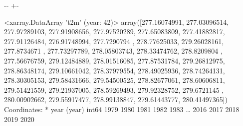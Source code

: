 \documentclass[letterpaper,10pt,english]{sphinxmanual}
\newlength\nbsphinxcodecellspacing
\begin{document}
{
\begin{sphinxVerbatim}[commandchars=\\\{\}]
\llap{\color{nbsphinxin}[35]:\,\hspace{\fboxrule}\hspace{\fboxsep}}  
    \PYG{p}{[}\PYG{p}{]}  
                 
             
    \PYG{p}{[} \PYG{p}{]}   
\end{sphinxVerbatim}
}

{

\kern-\sphinxverbatimsmallskipamount\kern-\baselineskip
\kern+\FrameHeightAdjust\kern-\fboxrule
\vspace{\nbsphinxcodecellspacing}

\begin{sphinxVerbatim}[commandchars=\\\{\}]
\llap{\color{nbsphinxout}[35]:\,\hspace{\fboxrule}\hspace{\fboxsep}}<xarray.DataArray 't2m' (year: 42)>
array([277.16074991, 277.03096514, 277.97289103, 277.91908656,
       277.97520289, 277.65083809, 277.41882817, 277.91126484,
       276.91748994, 277.7290794 , 278.77625033, 279.26028161,
       277.8734671 , 277.73297789, 278.05803743, 278.33474762,
       278.8209804 , 277.56676759, 279.12484889, 278.01516085,
       277.87531784, 279.26812975, 278.86348174, 279.10661042,
       278.37979554, 278.49025936, 278.74264131, 278.30305153,
       279.58431666, 279.54500525, 278.82677061, 278.60606811,
       279.51421559, 279.21937005, 278.59269493, 279.92328752,
       279.6721145 , 280.00902662, 279.55917477, 278.99138847,
       279.61443777, 280.41497365])
Coordinates:
  * year     (year) int64 1979 1980 1981 1982 1983 {\ldots} 2016 2017 2018 2019 2020
\end{sphinxVerbatim}
}
\end{document}
